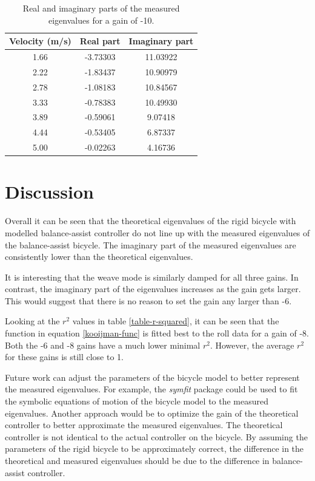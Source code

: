 \documentclass[12pt]{article}
\begin{document}
\begin{table}[]
    \centering
    \caption{Real and imaginary parts of the measured eigenvalues for a gain of -10.}
    \label{table-eigenvalues-gain-10}
    \begin{tabular}{c|c|c}
        \textbf{Velocity (m/s)} & \textbf{Real part} & \textbf{Imaginary part} \\ \hline
        1.66                    & -3.73303           & 11.03922                \\
        2.22                    & -1.83437           & 10.90979                \\
        2.78                    & -1.08183           & 10.84567                \\
        3.33                    & -0.78383           & 10.49930                \\
        3.89                    & -0.59061           & 9.07418                 \\
        4.44                    & -0.53405           & 6.87337                 \\
        5.00                    & -0.02263           & 4.16736
    \end{tabular}
\end{table}

\section{Discussion}
Overall it can be seen that the theoretical eigenvalues of the rigid bicycle with modelled
balance-assist controller do not line up with the measured eigenvalues of the balance-assist
bicycle. The imaginary part of the measured eigenvalues are consistently lower than the theoretical
eigenvalues.

It is interesting that the weave mode is similarly damped for all three gains. In contrast, the
imaginary part of the eigenvalues increases as the gain gets larger. This would suggest that there
is no reason to set the gain any larger than -6.

Looking at the $r^2$ values in table \ref{table-r-squared}, it can be seen that the function in
equation \ref{kooijman-func} is fitted best to the roll data for a gain of -8. Both the -6 and -8
gains have a much lower minimal $r^2$. However, the average $r^2$ for these gains is still close to
1.

Future work can adjust the parameters of the bicycle model to better represent the measured
eigenvalues. For example, the \emph{symfit} package \cite{symfit} could be used to fit the symbolic
equations of motion of the bicycle model to the measured eigenvalues. Another approach would be to
optimize the gain of the theoretical controller to better approximate the measured eigenvalues. The
theoretical controller is not identical to the actual controller on the bicycle. By assuming the
parameters of the rigid bicycle to be approximately correct, the difference in the theoretical and
measured eigenvalues should be due to the difference in balance-assist controller.



\end{document}

